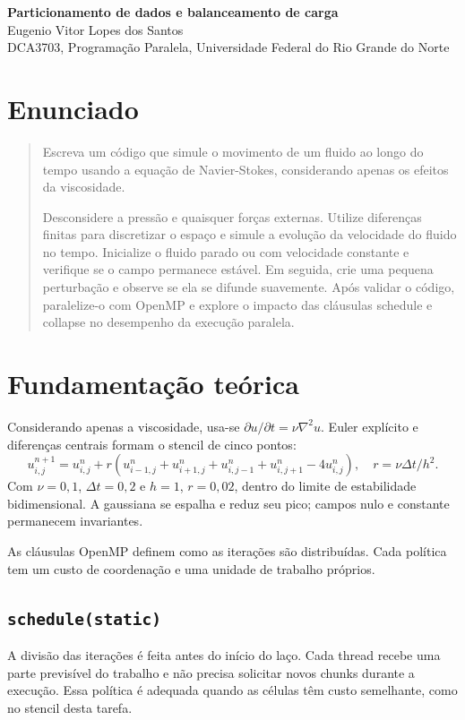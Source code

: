 \documentclass[11pt,letterpaper]{article}
\begin{document}
\pagestyle{plain}
\begin{center}
{\LARGE\bfseries Particionamento de dados e balanceamento de carga}\\[0.4em]
{\normalsize Eugenio Vitor Lopes dos Santos}\\[0.3em]
{\small DCA3703, Programação Paralela, Universidade Federal do Rio Grande do Norte}
\end{center}

\section{Enunciado}
\begin{quote}
Escreva um código que simule o movimento de um fluido ao longo do tempo usando a equação de Navier-Stokes, considerando apenas os efeitos da viscosidade.

Desconsidere a pressão e quaisquer forças externas. Utilize diferenças finitas para discretizar o espaço e simule a evolução da velocidade do fluido no tempo. Inicialize o fluido parado ou com velocidade constante e verifique se o campo permanece estável. Em seguida, crie uma pequena perturbação e observe se ela se difunde suavemente. Após validar o código, paralelize-o com OpenMP e explore o impacto das cláusulas schedule e collapse no desempenho da execução paralela.
\end{quote}

\section{Fundamentação teórica}
Considerando apenas a viscosidade, usa-se $\partial u/\partial t=\nu\nabla^2u$. Euler explícito e diferenças centrais formam o stencil de cinco pontos:
\[
u^{n+1}_{i,j}=u^n_{i,j}+r(u^n_{i-1,j}+u^n_{i+1,j}+u^n_{i,j-1}+u^n_{i,j+1}-4u^n_{i,j}),\quad r=\nu\Delta t/h^2.
\]
Com $\nu=0{,}1$, $\Delta t=0{,}2$ e $h=1$, $r=0{,}02$, dentro do limite de estabilidade bidimensional. A gaussiana se espalha e reduz seu pico; campos nulo e constante permanecem invariantes.

As cláusulas OpenMP definem como as iterações são distribuídas. Cada política tem um custo de coordenação e uma unidade de trabalho próprios.

\subsection{\texttt{schedule(static)}}
A divisão das iterações é feita antes do início do laço. Cada thread recebe uma parte previsível do trabalho e não precisa solicitar novos chunks durante a execução. Essa política é adequada quando as células têm custo semelhante, como no stencil desta tarefa.
\end{document}
